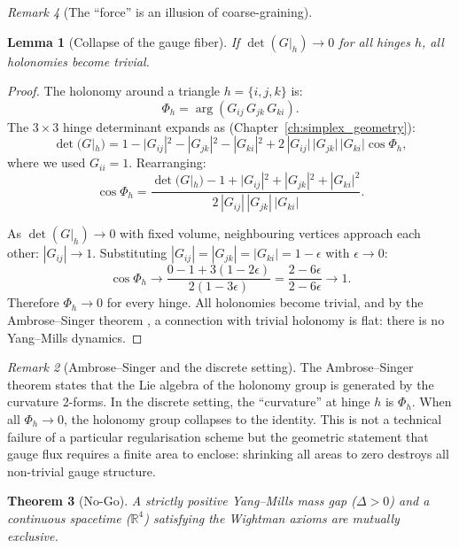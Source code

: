 \documentclass[12pt]{article}
\newtheorem{theorem}{Theorem}[section]
\newtheorem{lemma}[theorem]{Lemma}
\theoremstyle{remark}
\newtheorem{remark}[theorem]{Remark}
\theoremstyle{definition}
\newcommand{\RR}{\mathbb{R}}
\begin{document}
\begin{remark}[The ``force'' is an illusion of coarse-graining]
\begin{lemma}[Collapse of the gauge fiber]
\label{lem:fiber}
If $\det(G|_h) \to 0$ for all hinges $h$, all holonomies become
trivial.
\end{lemma}

\begin{proof}
The holonomy around a triangle $h = \{i, j, k\}$ is:
\begin{equation}
\Phi_h = \arg(G_{ij}\, G_{jk}\, G_{ki}).
\end{equation}
The $3 \times 3$ hinge determinant expands as (Chapter~\ref{ch:simplex_geometry}):
\begin{equation}
\det(G|_h) = 1 - |G_{ij}|^2 - |G_{jk}|^2 - |G_{ki}|^2
  + 2\,|G_{ij}|\,|G_{jk}|\,|G_{ki}|\cos\Phi_h,
\end{equation}
where we used $G_{ii} = 1$.  Rearranging:
\begin{equation}
\cos\Phi_h = \frac{\det(G|_h) - 1 + |G_{ij}|^2 + |G_{jk}|^2 + |G_{ki}|^2}
{2\,|G_{ij}|\,|G_{jk}|\,|G_{ki}|}.
\label{eq:cosPhidet}
\end{equation}

As $\det(G|_h) \to 0$ with fixed volume, neighbouring vertices approach
each other: $|G_{ij}| \to 1$.  Substituting
$|G_{ij}| = |G_{jk}| = |G_{ki}| = 1 - \epsilon$ with
$\epsilon \to 0$:
\begin{equation}
\cos\Phi_h \to \frac{0 - 1 + 3(1 - 2\epsilon)}{2(1 - 3\epsilon)}
= \frac{2 - 6\epsilon}{2 - 6\epsilon} \to 1.
\end{equation}
Therefore $\Phi_h \to 0$ for every hinge.  All holonomies become
trivial, and by the Ambrose--Singer theorem \cite{Ambrose-Singer},
a connection with trivial holonomy is flat: there is no Yang--Mills
dynamics.
\end{proof}

\begin{remark}[Ambrose--Singer and the discrete setting]
The Ambrose--Singer theorem states that the Lie algebra of the holonomy
group is generated by the curvature 2-forms.  In the discrete setting,
the ``curvature'' at hinge $h$ is $\Phi_h$.  When all $\Phi_h \to 0$,
the holonomy group collapses to the identity.  This is not a technical
failure of a particular regularisation scheme but the geometric statement
that gauge flux requires a finite area to enclose: shrinking all areas
to zero destroys all non-trivial gauge structure.
\end{remark}

\begin{theorem}[No-Go]
\label{thm:nogo}
A strictly positive Yang--Mills mass gap ($\Delta > 0$) and a continuous
spacetime ($\RR^4$) satisfying the Wightman axioms are mutually
exclusive.
\end{theorem}


\end{remark}
\end{document}
